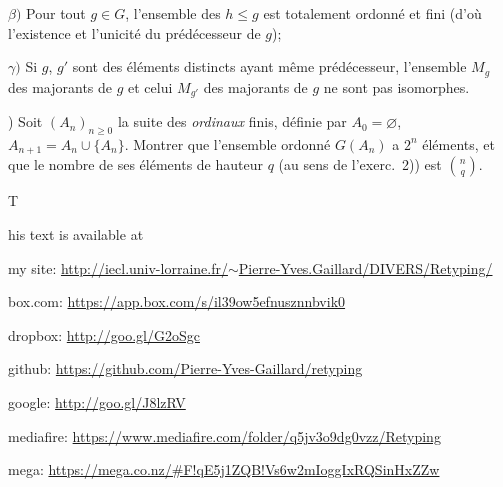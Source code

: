 \documentclass[12pt]{article}
\newcommand{\nn}{\noindent}
\begin{document}
$\beta)$ Pour tout $g\in G$, l'ensemble des $h \leq g$ est totalement ordonné et fini (d'où l'existence et l'unicité du prédécesseur de $g$);

$\gamma)$ Si $g$, $g'$ sont des éléments distincts ayant même prédécesseur, l'ensemble $M_g$ des majorants de $g$ et celui $M_{g'}$ des majorants de $g$ ne sont pas isomorphes.

\nn4) Soit $(A_n)_{n\geq 0}$ la suite des \emph{ordinaux} finis, définie par $A_0=\varnothing$, $A_{n+1}=A_n \cup \{A_n\}$. Montrer que l'ensemble ordonné $G(A_n)$ a $2^n$ éléments, et que le nombre de ses éléments de hauteur $q$ (au sens de l'exerc.~2)) est $\binom{n}{q}$.\bigskip

\centerline*

This text is available at 

\nn my site: \href{http://iecl.univ-lorraine.fr/~Pierre-Yves.Gaillard/DIVERS/Retyping/}{http://iecl.univ-lorraine.fr/$\sim$Pierre-Yves.Gaillard/DIVERS/Retyping/}

\nn box.com: \href{https://app.box.com/s/il39ow5efnusznnbvik0}{https://app.box.com/s/il39ow5efnusznnbvik0}

\nn dropbox: \href{http://goo.gl/G2oSgc}{http://goo.gl/G2oSgc}

\nn github: \href{https://github.com/Pierre-Yves-Gaillard/retyping}{https://github.com/Pierre-Yves-Gaillard/retyping}

\nn google: \href{http://goo.gl/J8lzRV}{http://goo.gl/J8lzRV}

\nn mediafire: \href{https://www.mediafire.com/folder/q5jv3o9dg0vzz/Retyping}{https://www.mediafire.com/folder/q5jv3o9dg0vzz/Retyping}

\nn mega: \href{https://mega.co.nz/#F!qE5j1ZQB!Vs6w2mIoggIxRQSinHxZZw}{https://mega.co.nz/\#F!qE5j1ZQB!Vs6w2mIoggIxRQSinHxZZw}
\end{document}
